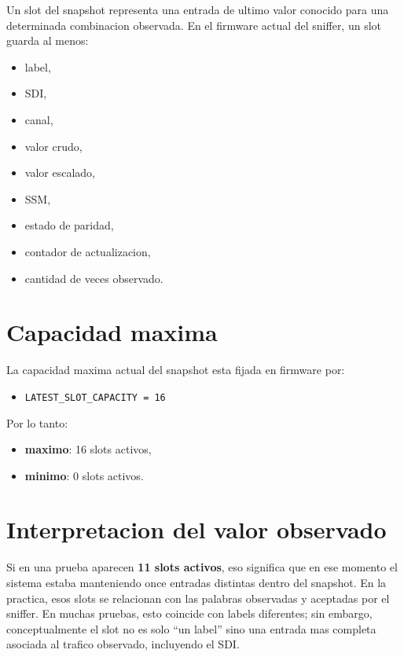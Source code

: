 \documentclass[12pt,a4paper]{report}
\begin{document}
Un slot del snapshot representa una entrada de ultimo valor conocido para una determinada combinacion observada. En el firmware actual del sniffer, un slot guarda al menos:

\begin{itemize}
    \item label,
    \item SDI,
    \item canal,
    \item valor crudo,
    \item valor escalado,
    \item SSM,
    \item estado de paridad,
    \item contador de actualizacion,
    \item cantidad de veces observado.
\end{itemize}

\section{Capacidad maxima}

La capacidad maxima actual del snapshot esta fijada en firmware por:

\begin{itemize}
    \item \texttt{LATEST\_SLOT\_CAPACITY = 16}
\end{itemize}

Por lo tanto:

\begin{itemize}
    \item \textbf{maximo}: 16 slots activos,
    \item \textbf{minimo}: 0 slots activos.
\end{itemize}

\section{Interpretacion del valor observado}

Si en una prueba aparecen \textbf{11 slots activos}, eso significa que en ese momento el sistema estaba manteniendo once entradas distintas dentro del snapshot. En la practica, esos slots se relacionan con las palabras observadas y aceptadas por el sniffer. En muchas pruebas, esto coincide con labels diferentes; sin embargo, conceptualmente el slot no es solo ``un label'' sino una entrada mas completa asociada al trafico observado, incluyendo el SDI.
\end{document}
